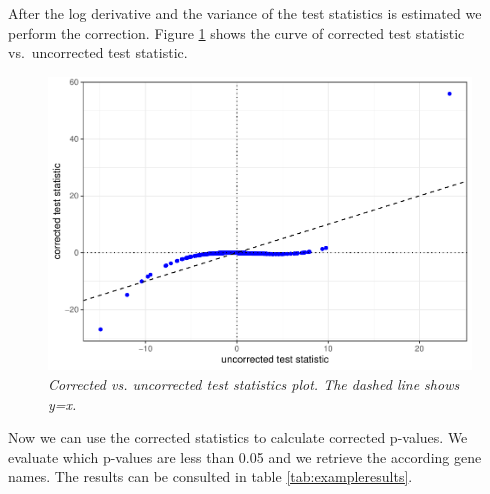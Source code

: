 \documentclass[
]{article}
\begin{document}
After the log derivative and the variance of the test statistics is estimated we perform the correction. Figure \ref{fig:beforeafter} shows the curve of corrected test statistic vs.~uncorrected test statistic.

\begin{figure}

{\centering \includegraphics[width=0.75\linewidth]{main_files/figure-latex/beforeafter-1} 

}

\caption{\textit{Corrected vs. uncorrected test statistics plot. The dashed line shows y=x.}}\label{fig:beforeafter}
\end{figure}

Now we can use the corrected statistics to calculate corrected p-values. We evaluate which p-values are less than 0.05 and we retrieve the according gene names. The results can be consulted in table \ref{tab:exampleresults}.
\end{document}
